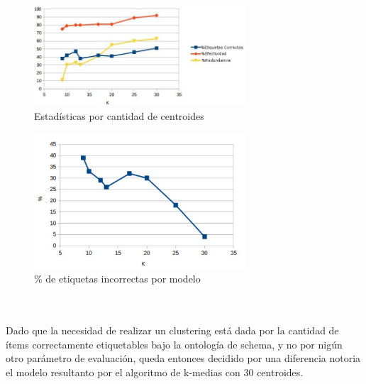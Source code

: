 \begin{figure}
  \centering
    \includegraphics[width=0.7\textwidth]{chart2}
  \caption{Estadísticas por cantidad de centroides}
  \label{fig:ejemplo}
\end{figure}
\begin{figure}
  \centering
    \includegraphics[width=0.7\textwidth]{char3}
  \caption{\% de etiquetas incorrectas por modelo}
  \label{fig:ejemplo}
\end{figure}
\\
\\
Dado que la necesidad de realizar un clustering está dada por la cantidad de ítems correctamente etiquetables bajo la ontología de schema, 
y no por nigún otro parámetro de evaluación, queda entonces decidido por una diferencia notoria el modelo resultanto por el algoritmo de k-medias 
con 30 centroides.
